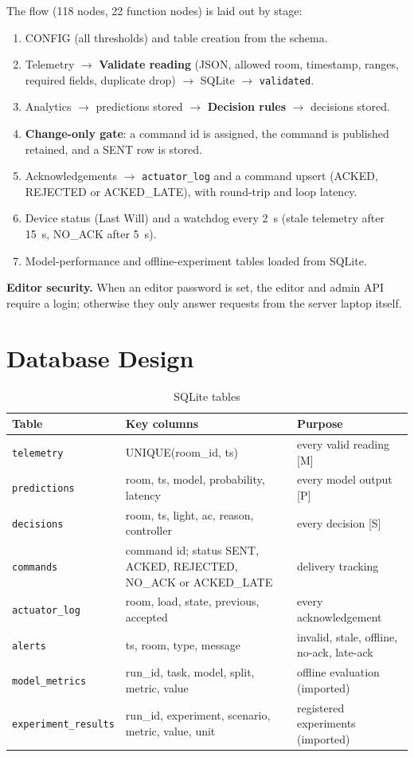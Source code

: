 \documentclass[12pt,a4paper,oneside]{report}
\newcommand{\ra}{$\rightarrow$}
\begin{document}
The flow (118 nodes, 22 function nodes) is laid out by stage:
\begin{enumerate}
\item CONFIG (all thresholds) and table creation from the schema.
\item Telemetry \ra{} \textbf{Validate reading} (JSON, allowed room, timestamp, ranges, required fields, duplicate
  drop) \ra{} SQLite \ra{} \texttt{validated}.
\item Analytics \ra{} predictions stored \ra{} \textbf{Decision rules} \ra{} decisions stored.
\item \textbf{Change-only gate}: a command id is assigned, the command is published retained, and a SENT row is
  stored.
\item Acknowledgements \ra{} \texttt{actuator\_log} and a command upsert (ACKED, REJECTED or ACKED\_LATE), with
  round-trip and loop latency.
\item Device status (Last Will) and a watchdog every 2~s (stale telemetry after 15~s, NO\_ACK after 5~s).
\item Model-performance and offline-experiment tables loaded from SQLite.
\end{enumerate}

\textbf{Editor security.} When an editor password is set, the editor and admin API require a login; otherwise they
only answer requests from the server laptop itself.

\section{Database Design}
\begin{table}[H]
\centering
\caption{SQLite tables}
\label{tab:db}
\footnotesize
\begin{tabularx}{\textwidth}{@{}L{3.3cm}L{5.8cm}Y@{}}
\toprule
\textbf{Table} & \textbf{Key columns} & \textbf{Purpose}\\
\midrule
\texttt{telemetry} & UNIQUE(room\_id, ts) & every valid reading [M]\\
\texttt{predictions} & room, ts, model, probability, latency & every model output [P]\\
\texttt{decisions} & room, ts, light, ac, reason, controller & every decision [S]\\
\texttt{commands} & command id; status SENT, ACKED, REJECTED, NO\_ACK or ACKED\_LATE & delivery tracking\\
\texttt{actuator\_log} & room, load, state, previous, accepted & every acknowledgement\\
\texttt{alerts} & ts, room, type, message & invalid, stale, offline, no-ack, late-ack\\
\texttt{model\_metrics} & run\_id, task, model, split, metric, value & offline evaluation (imported)\\
\texttt{experiment\_results} & run\_id, experiment, scenario, metric, value, unit & registered experiments (imported)\\
\bottomrule
\end{tabularx}
\end{table}
\end{document}

